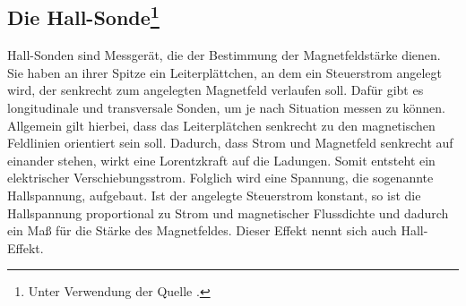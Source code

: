 \subsection[Die Hall-Sonde]{Die Hall-Sonde\footnote{Unter Verwendung der Quelle \cite{man:v308}.}}
Hall-Sonden sind Messgerät, die der Bestimmung der Magnetfeldstärke dienen.
Sie haben an ihrer Spitze ein Leiterplättchen, an dem ein Steuerstrom angelegt wird,
der senkrecht zum angelegten Magnetfeld verlaufen soll.
Dafür gibt es longitudinale und transversale Sonden, um je nach Situation messen zu können.
Allgemein gilt hierbei, dass das Leiterplätchen senkrecht zu den magnetischen Feldlinien orientiert sein soll.
Dadurch, dass Strom und Magnetfeld senkrecht auf einander stehen, wirkt eine Lorentzkraft auf die Ladungen.
Somit entsteht ein elektrischer Verschiebungsstrom.
Folglich wird eine Spannung, die sogenannte Hallspannung, aufgebaut.
Ist der angelegte Steuerstrom konstant, so ist die Hallspannung proportional zu Strom und magnetischer Flussdichte und
dadurch ein Maß für die Stärke des Magnetfeldes.
Dieser Effekt nennt sich auch Hall-Effekt.

